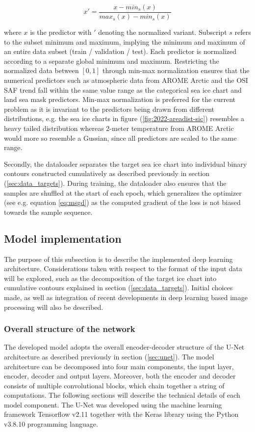 \documentclass[../main/thesis]{subfiles}
\begin{document}
\begin{equation}
    x' = \frac{x - min_s(x)}{max_s(x) - min_s(x)}
\end{equation}

where $x$ is the predictor with $'$ denoting the normalized variant. Subscript $s$ refers to the subset minimum and maximum, implying the minimum and maximum of an entire data subset (train / validation / test). Each predictor is normalized according to a separate global minimum and maximum. Restricting the normalized data between $\left[0, 1\right]$ through min-max normalization ensures that the numerical predictors such as atmospheric data from AROME Arctic and the OSI SAF trend fall within the same value range as the categorical sea ice chart and land sea mask predictors. Min-max normalization is preferred for the current problem as it is invariant to the predictors being drawn from different distributions, e.g. the sea ice charts in figure (\ref{fig:2022-areadist-sic}) resembles a heavy tailed distribution whereas 2-meter temperature from AROME Arctic would more so resemble a Gussian, since all predictors are scaled to the same range.

Secondly, the dataloader separates the target sea ice chart into individual binary contours constructed cumulatively as described previously in section (\ref{sec:data_targets}). During training, the dataloader also ensures that the samples are shuffled at the start of each epoch, which generalizes the optimizer (see e.g. equation \ref{eq:msgd}) as the computed gradient of the loss is not biased towards the sample sequence.

\subsection{Model implementation}
\label{sec:implementation}
The purpose of this subsection is to describe the implemented deep learning architecture. Considerations taken with respect to the format of the input data will be explored, such as the decomposition of the target ice chart into cumulative contours explained in section (\ref{sec:data_targets}). Initial choices made, as well as integration of recent developments in deep learning based image processing will also be described.

\subsubsection{Overall structure of the network}
The developed model adopts the overall encoder-decoder structure of the U-Net architecture as described previously in section (\ref{sec:unet}). The model architecture can be decomposed into four main components, the input layer, encoder, decoder and output layers. Moreover, both the encoder and decoder consists of multiple convolutional blocks, which chain together a string of computations. The following sections will describe the technical details of each model component. The U-Net was developed using the machine learning framework Tensorflow v2.11 \citep{tensorflow2015-whitepaper} together with the Keras library \citep{chollet2015keras} using the Python v3.8.10 programming language. 
\end{document}
